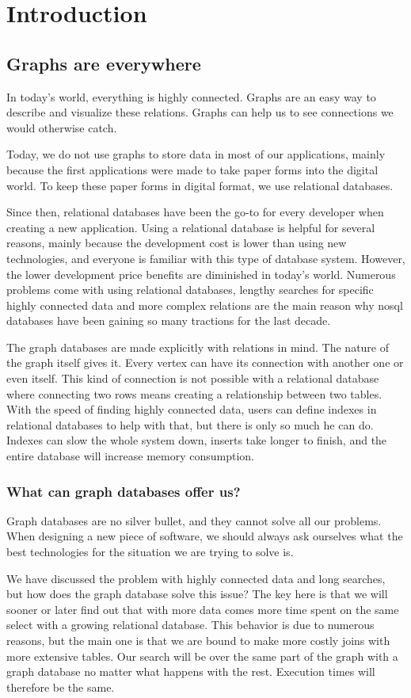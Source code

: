\chapter{Introduction}

\section{Graphs are everywhere}

In today's world, everything is highly connected. Graphs are an easy way to describe and visualize these relations. Graphs can help us to see connections we would otherwise catch.

Today, we do not use graphs to store data in most of our applications, mainly because the first applications were made to take paper forms into the digital world. To keep these paper forms in digital format, we use relational databases.

Since then, relational databases have been the go-to for every developer when creating a new application. Using a relational database is helpful for several reasons, mainly because the development cost is lower than using new technologies, and everyone is familiar with this type of database system. However, the lower development price benefits are diminished in today's world. Numerous problems come with using relational databases,
lengthy searches for specific highly connected data and more complex relations are the main reason why \Gls{nosql} databases have been gaining so many tractions for the last decade.

The graph databases are made explicitly with relations in mind. The nature of the graph itself gives it. Every vertex can have its connection with another one or even itself. This kind of connection is not possible with a relational database where connecting two rows means creating a relationship between two tables. With the speed of finding highly connected data, users can define indexes in relational databases to help with that, but there is only so much he can do. Indexes can slow the whole system down, inserts take longer to finish, and the entire database will increase memory consumption.

\subsection{What can graph databases offer us?}

Graph databases are no silver bullet, and they cannot solve all our problems. When designing a new piece of software, we should always ask ourselves what the best technologies for the situation we are trying to solve is.

We have discussed the problem with highly connected data and long searches, but how does the graph database solve this issue? The key here is that we will sooner or later find out that with more data comes more time spent on the same select with a growing relational database. This behavior is due to numerous reasons, but the main one is that we are bound to make more costly joins with more extensive tables. Our search will be over the same part of the graph with a graph database no matter what happens with the rest. Execution times will therefore be the same.
